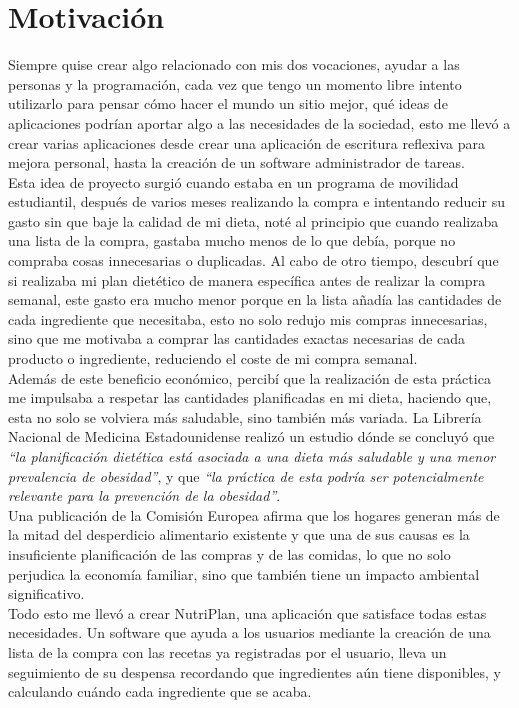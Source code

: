 \documentclass[12pt,a4paper]{report} %
\begin{document}
	\section*{Motivación}
	Siempre quise crear algo relacionado con mis dos vocaciones, ayudar a las personas y la programación, cada vez que tengo un momento libre intento utilizarlo para pensar cómo hacer el mundo un sitio mejor, qué ideas de aplicaciones podrían aportar algo a las necesidades de la sociedad, esto me llevó a crear varias aplicaciones desde crear una aplicación de escritura reflexiva para mejora personal, hasta la creación de un software administrador de tareas.
	\\
	Esta idea de proyecto surgió cuando estaba en un programa de movilidad estudiantil, después de varios meses realizando la compra e intentando reducir su gasto sin que baje la calidad de mi dieta, noté al principio que cuando realizaba una lista de la compra, gastaba mucho menos de lo que debía, porque no compraba cosas innecesarias o duplicadas. Al cabo de otro tiempo, descubrí que si realizaba mi plan dietético de manera específica antes de realizar la compra semanal, este gasto era mucho menor porque en la lista añadía las cantidades de cada ingrediente que necesitaba, esto no solo redujo mis compras innecesarias, sino que me motivaba a comprar las cantidades exactas necesarias de cada producto o ingrediente, reduciendo el coste de mi compra semanal. 
	\\
	Además de este beneficio económico, percibí que la realización de esta práctica me impulsaba a respetar las cantidades planificadas en mi dieta, haciendo que, esta no solo se volviera más saludable, sino también más variada.
	La Librería Nacional de Medicina Estadounidense realizó un estudio dónde se concluyó que \textit{“la planificación dietética está asociada a una dieta más saludable y una menor prevalencia de obesidad”}\cite{NLMMealPlanningBenefits}, y que \textit{“la práctica de esta podría ser potencialmente relevante para la prevención de la obesidad”}\cite{NLMMealPlanningBenefits}. 
	\\
	Una publicación de la Comisión Europea afirma que los hogares generan más de la mitad del desperdicio alimentario existente y que una de sus causas es la insuficiente planificación de las compras y de las comidas, lo que no solo perjudica la economía familiar, sino que también tiene un impacto ambiental significativo.
	\\
	Todo esto me llevó a crear NutriPlan, una aplicación que satisface todas estas necesidades. Un software que ayuda a los usuarios mediante la creación de una lista de la compra con las recetas ya registradas por el usuario, lleva un seguimiento de su despensa recordando que ingredientes aún tiene disponibles, y calculando cuándo cada ingrediente que se acaba.
	
\end{document}
